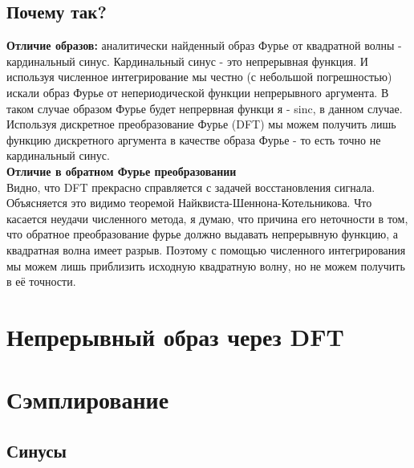 \subsection{Почему так?}

\noindent \textbf{Отличие образов:} аналитически найденный образ Фурье от квадратной волны - кардинальный синус. Кардинальный синус - это непрерывная функция. И используя численное интегрирование мы честно (с небольшой погрешностью) искали образ Фурье от непериодической функции непрерывного аргумента. В таком случае образом Фурье будет непрервная функци я - sinc, в данном случае. Используя дискретное преобразование Фурье (DFT) мы можем получить лишь функцию дискретного аргумента в качестве образа Фурье - то есть точно не кардинальный синус.
\\
\noindent \textbf{Отличие в обратном Фурье преобразовании}\\Видно, что DFT прекрасно справляется с задачей восстановления сигнала. Объясняется это видимо теоремой Найквиста-Шеннона-Котельникова. Что касается неудачи численного метода, я думаю, что причина его неточности в том, что обратное преобразование фурье должно выдавать непрерывную функцию, а квадратная волна имеет разрыв. Поэтому с помощью численного интегрирования мы можем лишь приблизить исходную квадратную волну, но не можем получить в её точности.   

\noindent \section{Непрерывный образ через DFT}

\section{Сэмплирование}
\subsection{Синусы}

